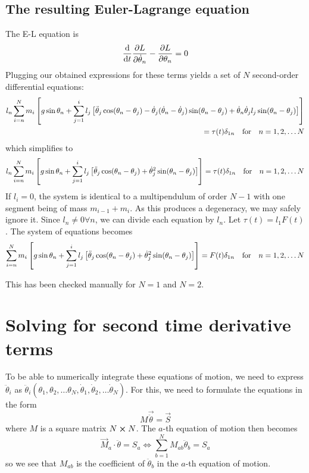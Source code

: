 \documentclass[12pt]{article}
\begin{document}
	\subsection{The resulting Euler-Lagrange equation}
	The E-L equation is
	$$\dv{t}\pdv{L}{\dot{\theta}_n}-\pdv{L}{\theta_n}=0$$
	Plugging our obtained expressions for these terms yields a set of $N$ second-order differential equations:
	\begin{eqnarray*}
	l_n\sum_{i=n}^N m_i\left[g \sin{\theta_n} + \sum_{j=1}^il_j\left[ \ddot{\theta}_j\cos(\theta_n-\theta_j)-\dot{\theta}_j(\dot{\theta}_n-\dot{\theta}_j)\sin(\theta_n-\theta_j)   + \dot{\theta}_n \dot{\theta}_j l_j \sin(\theta_n - \theta_j) \right]     \right]\\
	=\tau(t)\delta_{1n}\qq{for}n=1,2,\dots N
	\end{eqnarray*}
	which simplifies to
	\begin{eqnarray*}
	l_n\sum_{i=n}^N m_i\left[g \sin{\theta_n} + \sum_{j=1}^il_j\left[ \ddot{\theta}_j\cos(\theta_n-\theta_j)+\dot{\theta}_j^2 \sin(\theta_n-\theta_j) \right]     \right]=\tau(t)\delta_{1n}\qq{for}n=1,2,\dots N
	\end{eqnarray*}
	If $l_i = 0$, the system is identical to a multipendulum of order $N-1$ with one segment being of mass $m_{i-1}+m_i$. As this produces a degeneracy, we may safely ignore it. Since $l_n\neq 0\forall n$, we can divide each equation by $l_n$. Let $\tau(t)=l_1F(t)$. The system of equations becomes
	\begin{eqnarray*}
	\sum_{i=n}^N m_i\left[g \sin{\theta_n} + \sum_{j=1}^il_j\left[ \ddot{\theta}_j\cos(\theta_n-\theta_j)+\dot{\theta}_j^2 \sin(\theta_n-\theta_j) \right]     \right]=F(t)\delta_{1n}\qq{for}n=1,2,\dots N
	\end{eqnarray*}
	
	This has been checked manually for $N=1$ and $N=2$.
	
	\section{Solving for second time derivative terms}
	
	To be able to numerically integrate these equations of motion, we need to express $\ddot{\theta}_i$ as $\ddot{\theta}_i(\theta_1,\theta_2,\dots \theta_N, \dot{\theta}_1, \dot{\theta}_2,\dots \dot{\theta}_N)$. For this, we need to formulate the equations in the form
	$$M\vec{\ddot{\theta}}=\vec{S}$$
	where $M$ is a square matrix $N\cross N$. The $a$-th equation of motion then becomes
	$$\vec{M}_a \cdot \ddot{\theta} = S_a \iff \sum_{b=1}^N M_{ab}\ddot{\theta}_b=S_a$$
	so we see that $M_{ab}$ is the coefficient of $\ddot{\theta}_b$ in the $a$-th equation of motion.
	
\end{document}
